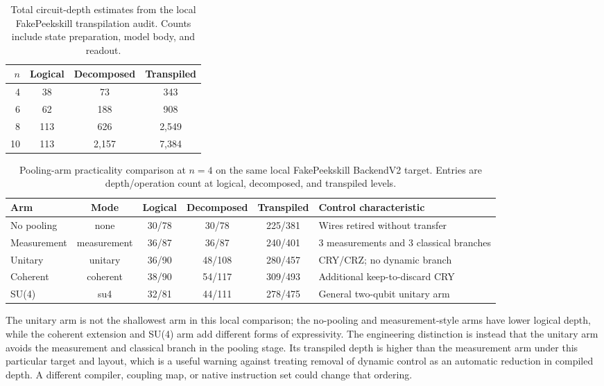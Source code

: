 \documentclass[conference]{IEEEtran}
\begin{document}
\begin{table}[!t]
\caption{Total circuit-depth estimates from the local FakePeekskill transpilation audit.  Counts include state preparation, model body, and readout.}
\label{tab:resources}
\centering
\begin{tabular}{@{}rccc@{}}
\toprule
\textbf{$n$} & \textbf{Logical} & \textbf{Decomposed} & \textbf{Transpiled} \\
\midrule
4 & 38 & 73 & 343 \\
6 & 62 & 188 & 908 \\
8 & 113 & 626 & 2,549 \\
10 & 113 & 2,157 & 7,384 \\
\bottomrule
\end{tabular}
\end{table}

\begin{table}[!t]
\caption{Pooling-arm practicality comparison at $n=4$ on the same local FakePeekskill BackendV2 target. Entries are depth/operation count at logical, decomposed, and transpiled levels.}
\label{tab:pooling-resources}
\centering
\small
\begin{tabular}{@{}lccccl@{}}
\toprule
\textbf{Arm} & \textbf{Mode} & \textbf{Logical} & \textbf{Decomposed} & \textbf{Transpiled} & \textbf{Control characteristic} \\
\midrule
No pooling & none & 30/78 & 30/78 & 225/381 & Wires retired without transfer \\
Measurement & measurement & 36/87 & 36/87 & 240/401 & 3 measurements and 3 classical branches \\
Unitary & unitary & 36/90 & 48/108 & 280/457 & CRY/CRZ; no dynamic branch \\
Coherent & coherent & 38/90 & 54/117 & 309/493 & Additional keep-to-discard CRY \\
SU(4) & su4 & 32/81 & 44/111 & 278/475 & General two-qubit unitary arm \\
\bottomrule
\end{tabular}
\end{table}

The unitary arm is not the shallowest arm in this local comparison; the
no-pooling and measurement-style arms have lower logical depth, while the
coherent extension and SU(4) arm add different forms of expressivity. The
engineering distinction is instead that the unitary arm avoids the measurement
and classical branch in the pooling stage. Its transpiled depth is higher than
the measurement arm under this particular target and layout, which is a useful
warning against treating removal of dynamic control as an automatic reduction
in compiled depth. A different compiler, coupling map, or native instruction
set could change that ordering.
\end{document}

